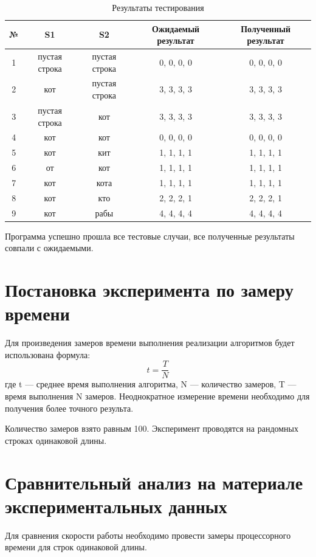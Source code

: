 \documentclass[12pt]{report}
\begin{document}
\newpage
 \begin{table}
	\begin{center}
	\caption{Результаты тестирования}
	\begin{tabular}{| c | c | c | c | c |}
			\hline
			№ & S1 & S2 & Ожидаемый результат & Полученный результат \\
			\hline
			1 & пустая строка & пустая строка & 0, 0, 0, 0 & 0, 0, 0, 0\\
			\hline
			2 & кот & пустая строка & 3, 3, 3, 3 & 3, 3, 3, 3\\
			\hline
			3 & пустая строка & кот & 3, 3, 3, 3 & 3, 3, 3, 3\\
			\hline
			4 & кот & кот & 0, 0, 0, 0 & 0, 0, 0, 0\\
			\hline
			5 & кот & кит & 1, 1, 1, 1 & 1, 1, 1, 1\\
			\hline
			6 & от & кот & 1, 1, 1, 1 & 1, 1, 1, 1\\
			\hline
			7 & кот & кота & 1, 1, 1, 1 & 1, 1, 1, 1\\
			\hline
			8 & кот & кто & 2, 2, 2, 1 & 2, 2, 2, 1\\
			\hline
			9 & кот & рабы & 4, 4, 4, 4 & 4, 4, 4, 4\\
			\hline
	\end{tabular} 
\end{center} 
 \end{table}
 \vspace{\baselineskip}
 Программа успешно прошла все тестовые случаи, все полученные результаты совпали с ожидаемыми. 
\newpage
\section{Постановка эксперимента по замеру времени}

Для произведения замеров времени выполнения реализации алгоритмов будет использована формула: \begin{equation}\label{eq:fourierrow}
	t = \frac{T}{N}
\end{equation}
где t — среднее время выполнения алгоритма, N — количество замеров, T — время выполнения N замеров.  
Неоднократное измерение времени необходимо для получения более точного результа.  
 
 Количество замеров взято равным 100. Эксперимент проводятся на рандомных строках одинаковой длины.


\section{Сравнительный анализ на материале экспериментальных данных}
Для сравнения скорости работы необходимо провести замеры процессорного времени  для строк одинаковой длины.
\end{document}
